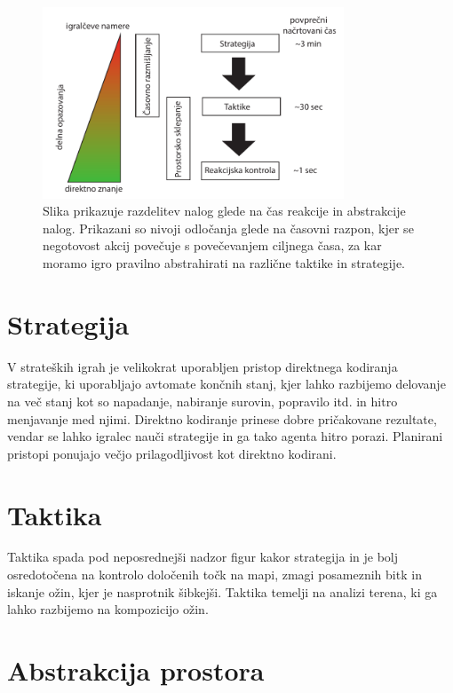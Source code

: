\documentclass[a4paper, 12pt]{book}
\begin{document}
\begin{itemize}
	\begin{figure}[h]
		\begin{center}
			\includegraphics[width=0.8\textwidth]{photos/RazdelitevNalog.pdf}
		\end{center}
		\caption{Slika prikazuje razdelitev nalog glede na čas reakcije in abstrakcije nalog. 
			Prikazani so nivoji odločanja glede na časovni razpon, kjer se negotovost akcij povečuje s povečevanjem ciljnega časa, za kar moramo igro pravilno abstrahirati na različne taktike in strategije. }
		\label{picRazdelitevNalog}
	\end{figure}

\end{itemize}

\section{Strategija}
V strateških igrah je velikokrat uporabljen pristop direktnega kodiranja strategije, ki uporabljajo avtomate končnih stanj, kjer lahko razbijemo delovanje na več stanj kot so napadanje, nabiranje surovin, popravilo itd. in hitro menjavanje med njimi. 
Direktno kodiranje prinese dobre pričakovane rezultate, vendar se lahko igralec nauči strategije in ga tako agenta hitro porazi.
Planirani pristopi ponujajo večjo prilagodljivost kot direktno kodirani.
\section{Taktika}
Taktika spada pod neposrednejši nadzor figur kakor strategija in je bolj osredotočena na kontrolo določenih točk na mapi, zmagi posameznih bitk in iskanje ožin, kjer je nasprotnik šibkejši. 
Taktika temelji na analizi terena, ki ga lahko razbijemo na kompozicijo ožin.

\section{Abstrakcija prostora}
\end{document}
